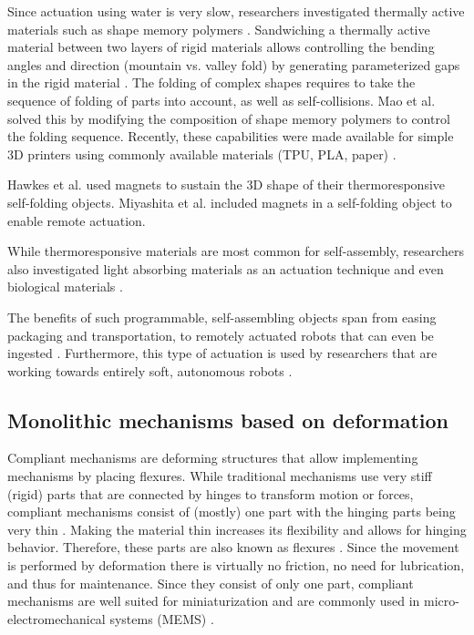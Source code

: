 {Since actuation using water is very slow, researchers investigated thermally active materials \cite{Ge2014} such as shape memory polymers \cite{Yu2015}. Sandwiching a thermally active material between two layers of rigid materials allows controlling the bending angles and direction (mountain vs. valley fold) by generating parameterized gaps in the rigid material \cite{An2014}. The folding of complex shapes requires to take the sequence of folding of parts into account, as well as self-collisions. Mao et al. \cite{Mao2015} solved this by modifying the composition of shape memory polymers  to control the folding sequence. Recently, these capabilities were made available for simple 3D printers using commonly available materials (TPU, PLA, paper) \cite{An2018, Wang2018}. 

Hawkes et al. \cite{Hawkes2010} used magnets to sustain the 3D shape of their thermoresponsive self-folding objects. Miyashita et al. \cite{Miyashita2015} included magnets in a self-folding object to enable remote actuation.

While thermoresponsive materials are most common for self-assembly, researchers also investigated light absorbing materials as an actuation technique \cite{Tolley2013} and even biological materials \cite{Yao2015, Wang2017a}.

The benefits of such programmable, self-assembling objects span from easing packaging and transportation, to remotely actuated robots \cite{Miyashita2015} that can even be ingested \cite{Miyashita2016}. Furthermore, this type of actuation is used by researchers that are working towards entirely soft, autonomous robots \cite{Wehner2016}.



\subsection{Monolithic mechanisms based on deformation}

Compliant mechanisms are deforming structures that allow implementing mechanisms by placing flexures. While traditional mechanisms use very stiff (rigid) parts that are connected by hinges to transform motion or forces, compliant mechanisms consist of (mostly) one part with the hinging parts being very thin \cite{Howell2013}. Making the material thin increases its flexibility and allows for hinging behavior. Therefore, these parts are also known as flexures \cite{Trease2005}. Since the movement is performed by deformation there is virtually no friction, no need for lubrication, and thus for maintenance. Since they consist of only one part, compliant mechanisms are well suited for miniaturization and are commonly used in micro-electromechanical systems (MEMS) \cite{Gafford2014}.

}
